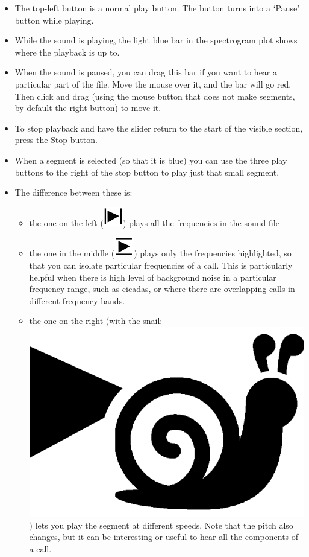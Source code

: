 \documentclass{article}
\begin{document}
\begin{itemize}
\begin{itemize}
\item The top-left button is a normal play button. The button turns into a `Pause' button while playing.  
\item While the sound is playing, the light blue bar in the spectrogram plot shows where the playback is up to. 
\item When the sound is paused, you can drag this bar if you want to hear a particular part of the file. Move the mouse over it, and the bar will go red. Then click and drag (using the mouse button that does not make segments, by default the right button) to move it. 
\item To stop playback and have the slider return to the start of the visible section, press the Stop button.
\item When a segment is selected (so that it is blue) you can use the three play buttons to the right of the stop button to play just that small segment. 
\item The difference between these is:
    \begin{itemize} 
    \item the one on the left (\includegraphics[scale=0.3]{Figures/playsegment}) plays all the frequencies in the sound file
    \item the one in the middle (\includegraphics[scale=0.3]{Figures/playBandLimited}) plays only the frequencies highlighted, so that you can isolate particular frequencies of a call. This is particularly helpful when there is high level of background noise in a particular frequency range, such as cicadas, or where there are overlapping calls in different frequency bands.
    \item the one on the right (with the snail: \includegraphics[scale=0.03]{Figures/playSlow-w}) lets you play the segment at different speeds. Note that the pitch also changes, but it can be interesting or useful to hear all the components of a call.

\end{itemize}
\end{itemize}
\end{itemize}
\end{document}
